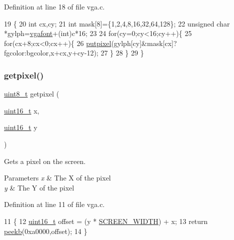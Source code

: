 Definition at line 18 of file vga.\+c.


\begin{DoxyCode}
19 \{
20     \textcolor{keywordtype}{int} cx,cy;
21     \textcolor{keywordtype}{int} mask[8]=\{1,2,4,8,16,32,64,128\};
22     \textcolor{keywordtype}{unsigned} \textcolor{keywordtype}{char} *gylph=\hyperlink{a00041_a586c0ac088deb9338d9b1464dcd587c8_a586c0ac088deb9338d9b1464dcd587c8}{vgafont}+(int)c*16;
23  
24     \textcolor{keywordflow}{for}(cy=0;cy<16;cy++)\{
25         \textcolor{keywordflow}{for}(cx+8;cx<0;cx++)\{
26             \hyperlink{a00041_ab17a69b465efb1ebe54a6a2e5d7b7ce8_ab17a69b465efb1ebe54a6a2e5d7b7ce8}{putpixel}(gylph[cy]&mask[cx]?fgcolor:bgcolor,x+cx,y+cy-12);
27         \}
28     \}
29 \}
\end{DoxyCode}
\mbox{\label{a00041_aac0685da0bbf1115c2b76b0aedf7e1f0_aac0685da0bbf1115c2b76b0aedf7e1f0}} 
\subsubsection{\texorpdfstring{getpixel()}{getpixel()}}
{\footnotesize\ttfamily \hyperlink{a00116_aba7bc1797add20fe3efdf37ced1182c5_aba7bc1797add20fe3efdf37ced1182c5}{uint8\+\_\+t} getpixel (\begin{DoxyParamCaption}\item[{\hyperlink{a00116_a273cf69d639a59973b6019625df33e30_a273cf69d639a59973b6019625df33e30}{uint16\+\_\+t}}]{x,  }\item[{\hyperlink{a00116_a273cf69d639a59973b6019625df33e30_a273cf69d639a59973b6019625df33e30}{uint16\+\_\+t}}]{y }\end{DoxyParamCaption})}



Gets a pixel on the screen. 


\begin{DoxyParams}{Parameters}
{\em x} & The X of the pixel \\
\hline
{\em y} & The Y of the pixel \\
\hline
\end{DoxyParams}


Definition at line 11 of file vga.\+c.


\begin{DoxyCode}
11                                          \{
12     \hyperlink{a00116_a273cf69d639a59973b6019625df33e30_a273cf69d639a59973b6019625df33e30}{uint16\_t} offset = (y * \hyperlink{a00044_a2cd109632a6dcccaa80b43561b1ab700_a2cd109632a6dcccaa80b43561b1ab700}{SCREEN\_WIDTH}) + x;
13     \textcolor{keywordflow}{return} \hyperlink{a00110_a353956c1fd65c7ed787836534fc9354e_a353956c1fd65c7ed787836534fc9354e}{peekb}(0xa0000,offset);
14 \}
\end{DoxyCode}
\mbox{\label{a00041_ab17a69b465efb1ebe54a6a2e5d7b7ce8_ab17a69b465efb1ebe54a6a2e5d7b7ce8}} 
